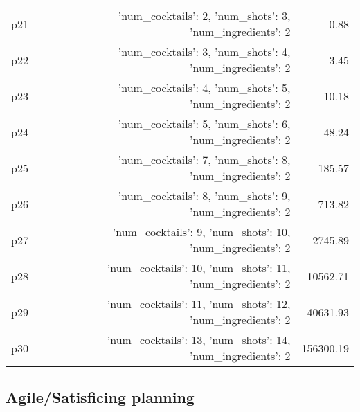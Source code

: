 \documentclass{article}
\begin{document}
\begin{center}
\begin{tabular}{@{}l|r|r@{}}
  p21&{'num\_cocktails': 2, 'num\_shots': 3, 'num\_ingredients': 2}&0.88\\
  p22&{'num\_cocktails': 3, 'num\_shots': 4, 'num\_ingredients': 2}&3.45\\
  p23&{'num\_cocktails': 4, 'num\_shots': 5, 'num\_ingredients': 2}&10.18\\
  p24&{'num\_cocktails': 5, 'num\_shots': 6, 'num\_ingredients': 2}&48.24\\
  p25&{'num\_cocktails': 7, 'num\_shots': 8, 'num\_ingredients': 2}&185.57\\
  p26&{'num\_cocktails': 8, 'num\_shots': 9, 'num\_ingredients': 2}&713.82\\
  p27&{'num\_cocktails': 9, 'num\_shots': 10, 'num\_ingredients': 2}&2745.89\\
  p28&{'num\_cocktails': 10, 'num\_shots': 11, 'num\_ingredients': 2}&10562.71\\
  p29&{'num\_cocktails': 11, 'num\_shots': 12, 'num\_ingredients': 2}&40631.93\\
  p30&{'num\_cocktails': 13, 'num\_shots': 14, 'num\_ingredients': 2}&156300.19
                            \end{tabular}
                            \end{center}
                    

                                \subsection*{Agile/Satisficing planning}
                                
\end{document}
